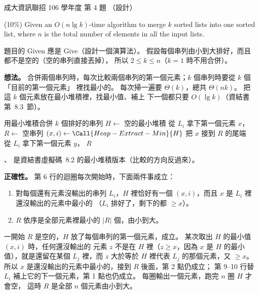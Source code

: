 \begin{pastexam}[label={px:ncku-106-prog-04}]{成大資訊聯招 106 學年度 第 4 題}
（設計）

(10\%) Given an $O(n\lg k)$-time algorithm to merge $k$ sorted lists into one sorted list, where
$n$ is the total number of elements in all the input lists.
\end{pastexam}

\begin{pastsoln}
題目的 Given 應是 Give（設計一個演算法）。 假設每個串列由小到大排好，而且都不是空的（空的串列直接丟掉），
所以 $2 \le k \le n$（$k = 1$ 時不用合併）。

\textbf{想法。} 合併兩個串列時，每次比較兩個串列的第一個元素；$k$ 個串列時要從 $k$ 個「目前的第一個元素」
裡找最小的。 每次掃一遍要 $\Theta(k)$，總共 $\Theta(nk)$。 把這 $k$ 個元素放在最小堆積裡，找最小值、補上
下一個都只要 $O(\lg k)$（資結書第~8.3~節）。

\begin{pseudo}{用最小堆積合併 $k$ 個排好的串列}
    \State $H \gets$ 空的最小堆積 
        \State 從 $L_i$ 拿下第一個元素 $x$，
    \EndFor
    \State $R \gets$ 空串列
        \State $(x, i) \gets \Call{Heap-Extract-Min}{H}$
        \State 把 $x$ 接到 $R$ 的尾端
            \State 從 $L_i$ 拿下第一個元素 $y$，
        \EndIf
    \EndWhile
    \State \Return $R$
\EndFunction
\end{pseudo}

、 是資結書虛擬碼~8.2 的最小堆積版本（比較的方向反過來）。

\textbf{正確性。} 第 6 行的迴圈每次開始時，下面兩件事成立：
\begin{enumerate}
\item 對每個還有元素沒輸出的串列 $L_i$，$H$ 裡恰好有一個 $(x, i)$，而且 $x$ 是 $L_i$ 裡還沒輸出的元素中最小的
（$L_i$ 排好了，剩下的都 $\ge x$）。
\item $R$ 依序是全部元素裡最小的 $|R|$ 個，由小到大。
\end{enumerate}
一開始 $R$ 是空的，$H$ 放了每個串列的第一個元素，成立。 某次取出 $H$ 的最小值 $(x, i)$ 時，任何還沒輸出的
元素 $z$ 不是在 $H$ 裡（$z \ge x$，因為 $x$ 是 $H$ 的最小值），就是還留在某個 $L_j$ 裡，而 $z$ 大於等於 $H$
裡代表 $L_j$ 的那個元素，又 $\ge x$。 所以 $x$ 是還沒輸出的元素中最小的，接到 $R$ 後面，第 2 點仍成立；
第 9--10 行替 $L_i$ 補上它的下一個元素，第 1 點也仍成立。 每圈輸出一個元素，跑完 $n$ 圈 $H$ 才會空，
這時 $R$ 是全部 $n$ 個元素由小到大。


\end{pastsoln}

